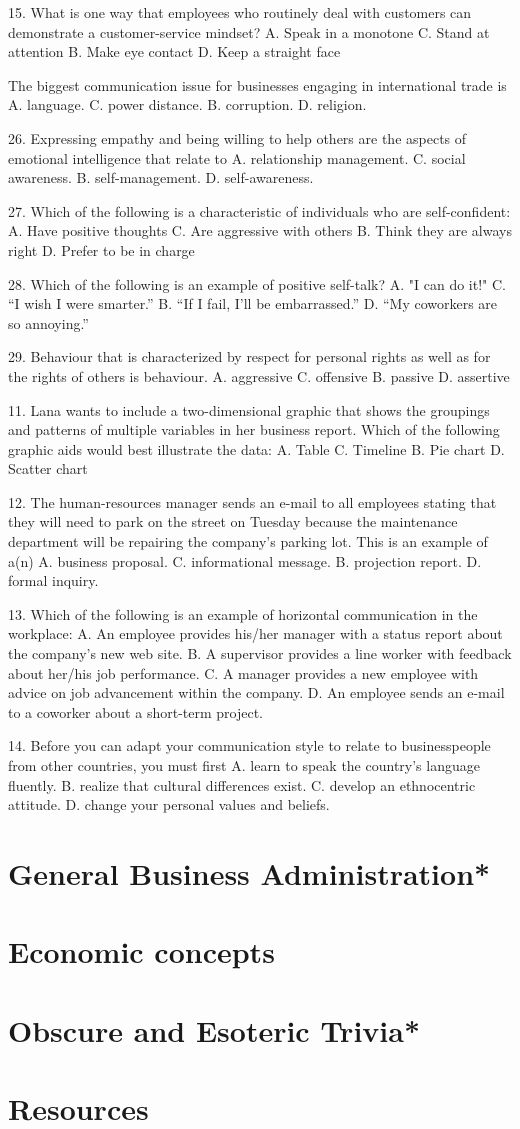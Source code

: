 \documentclass[12pt]{article}
\begin{document}
15. What is one way that employees who routinely deal with customers can demonstrate a customer-service
mindset?
A. Speak in a monotone C. Stand at attention
B. Make eye contact D. Keep a straight face

The biggest communication issue for businesses engaging in international trade is
A. language. C. power distance.
B. corruption. D. religion.

26. Expressing empathy and being willing to help others are the aspects of emotional intelligence that relate
to
A. relationship management. C. social awareness.
B. self-management. D. self-awareness.

27. Which of the following is a characteristic of individuals who are self-confident:
A. Have positive thoughts C. Are aggressive with others
B. Think they are always right D. Prefer to be in charge

28. Which of the following is an example of positive self-talk?
A. "I can do it!" C. “I wish I were smarter.”
B. “If I fail, I'll be embarrassed.” D. “My coworkers are so annoying.”

29. Behaviour that is characterized by respect for personal rights as well as for the rights of others is \underline{\hspace{2cm}} behaviour.
A. aggressive C. offensive
B. passive D. assertive

11. Lana wants to include a two-dimensional graphic that shows the groupings and patterns of multiple
variables in her business report. Which of the following graphic aids would best illustrate the data:
A. Table C. Timeline
B. Pie chart D. Scatter chart

12. The human-resources manager sends an e-mail to all employees stating that they will need to park on
the street on Tuesday because the maintenance department will be repairing the company's parking lot.
This is an example of a(n)
A. business proposal. C. informational message.
B. projection report. D. formal inquiry.

13. Which of the following is an example of horizontal communication in the workplace:
A. An employee provides his/her manager with a status report about the company's new web site.
B. A supervisor provides a line worker with feedback about her/his job performance.
C. A manager provides a new employee with advice on job advancement within the company.
D. An employee sends an e-mail to a coworker about a short-term project. 

14. Before you can adapt your communication style to relate to businesspeople from other countries, you
must first
A. learn to speak the country's language fluently.
B. realize that cultural differences exist.
C. develop an ethnocentric attitude.
D. change your personal values and beliefs. 



\section{General Business Administration*}
\section{Economic concepts}
\section{Obscure and Esoteric Trivia*}
\section{Resources}
\end{document}
